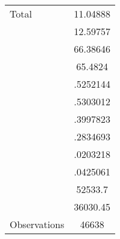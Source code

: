 {\begin{tabular}{l*{1}{c}}
Total               &    11.04888\\
                    &    12.59757\\
                    &    66.38646\\
                    &     65.4824\\
                    &    .5252144\\
                    &    .5303012\\
                    &    .3997823\\
                    &    .2834693\\
                    &    .0203218\\
                    &    .0425061\\
                    &     52533.7\\
                    &    36030.45\\
\hline
Observations        &       46638\\
\hline\hline
\end{tabular}
}
